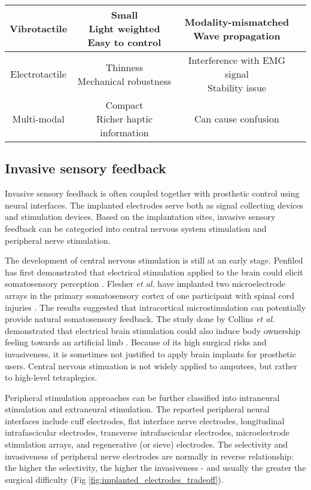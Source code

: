 \begin{table}[htp!]
\begin{tabular}{ |c|c|c|c|c|}
       \hline
       \multicolumn{2}{|c|}{Vibrotactile}      & \shortstack{Small \\Light weighted \\Easy to control}         & \shortstack{Modality-mismatched\\Wave propagation} \\
       \hline
       \multicolumn{2}{|c|}{Electrotactile}     & \shortstack{Thinness \\ Mechanical robustness}  & \shortstack{Interference with EMG signal\\Stability issue}  \\
       \hline
       \multicolumn{2}{|c|}{Multi-modal} &  \shortstack{Compact \\Richer haptic information} & Can cause confusion   \\
       \hline
    \end{tabular}
\end{table}


\subsection{Invasive sensory feedback}
Invasive sensory feedback is often coupled together with prosthetic control using neural interfaces. The implanted electrodes serve both as signal collecting devices and stimulation devices.
Based on the implantation sites, invasive sensory feedback can be categoried into central nervous system stimulation and peripheral nerve stimulation.  

The development of central nervous stimulation is still at an early stage. Penfiled has first demonstrated that electrical stimulation applied to the brain could elicit somatosensory perception \cite{penfield1937somatic}. 
Flesher \textit{et al.} have implanted two microelectrode arrays in the primary somatosensory cortex of one participant with spinal cord injuries \cite{flesher2016intracortical}.  The results suggested that intracortical microstimulation can potentially provide natural somatosensory feedback. The study done by Collins \textit{et al.} demonstrated that electrical brain stimulation could also induce body ownership feeling towards an artificial limb \cite{collins2016ownership}. Because of its high surgical risks and invasiveness, it is sometimes not justified to apply brain implants for prosthetic users. Central nervous stimuation is not widely applied to amputees, but rather to high-level tetraplegics.

Peripheral stimulation approaches can be further classified into intraneural stimulation and extraneural stimulation. The reported peripheral neural interfaces include cuff electrodes, flat interface nerve electrodes, longitudinal intrafascicular electrodes, transverse intrafascicular electrodes, microelectrode stimulation arrays, and regenerative (or sieve) electrodes. The selectivity and invasiveness of peripheral nerve electrodes are normally in reverse relationship: the higher the selectivity, the higher the invasiveness - and usually the greater the surgical difficulty (Fig \ref{fig:implanted_electrodes_tradeoff}). 


